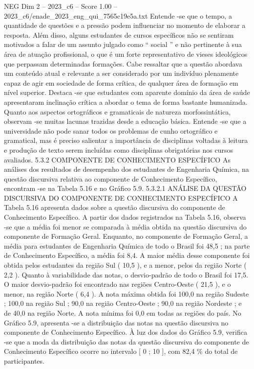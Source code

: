 \begin{textsample}{NEG Dim 2 – 2023\_c6 – Score 1.00 – 2023\_c6/enade\_2023\_eng\_qui\_7565c19e5a.txt}
Entende -se que o tempo, a quantidade de questões e a pressão podem influenciar no momento de elaborar a resposta.
Além disso, alguns estudantes de cursos específicos não se sentiram motivados a falar de um assunto julgado como “ social ” e não pertinente à sua área de atuação profissional, o que é um forte representativo de vieses ideológicos que perpassam determinadas formações.
Cabe ressaltar que a questão abordava um conteúdo atual e relevante a ser considerado por um indivíduo plenamente capaz de agir em sociedade de forma crítica, de qualquer área de formação em nível superior.
Destaca -se que estudantes com aparente domínio da área de saúde apresentaram inclinação crítica a abordar o tema de forma bastante humanizada.
Quanto aos aspectos ortográficos e gramaticais de natureza morfossintática, observam -se muitas lacunas trazidas desde a educação básica.
Entende -se que a universidade não pode sanar todos os problemas de cunho ortográfico e gramatical, mas é preciso salientar a importância de disciplinas voltadas à leitura e produção de texto serem incluídas como disciplinas obrigatórias nos cursos avaliados. 5.3.2 COMPONENTE DE CONHECIMENTO ESPECÍFICO As análises dos resultados de desempenho dos estudantes de Engenharia Química, na questão discursiva relativa ao componente de Conhecimento Específico, encontram -se na Tabela 5.16 e no Gráfico 5.9. 5.3.2.1 ANÁLISE DA QUESTÃO DISCURSIVA DO COMPONENTE DE CONHECIMENTO ESPECÍFICO A Tabela 5.16 apresenta dados sobre a questão discursiva do componente de Conhecimento Específico.
A partir dos dados registrados na Tabela 5.16, observa -se que a média foi menor se comparada à média obtida na questão discursiva do componente de Formação Geral.
Enquanto, no componente de Formação Geral, a média para estudantes de Engenharia Química de todo o Brasil foi 48,5 ; na parte de Conhecimento Específico, a média foi 8,4.
A maior média desse componente foi obtida pelos estudantes da região Sul ( 10,5 ), e a menor, pelos da região Norte ( 2,2 ).
Quanto à variabilidade das notas, o desvio-padrão de todo o Brasil foi 17,5.
O maior desvio-padrão foi encontrado nas regiões Centro-Oeste ( 21,5 ), e o menor, na região Norte ( 6,4 ).
A nota máxima obtida foi 100,0 na região Sudeste ; 100,0 na região Sul ; 90,0 na região Centro-Oeste ; 90,0 na região Nordeste ; e de 40,0 na região Norte.
A nota mínima foi 0,0 em todas as regiões do país.
No Gráfico 5.9, apresenta -se a distribuição das notas na questão discursiva no componente de Conhecimento Específico.
À luz dos dados do Gráfico 5.9, verifica -se que a moda da distribuição das notas da questão discursiva do componente de Conhecimento Específico ocorre no intervalo [ 0 ; 10 ], com 82,4 \% do total de participantes.

\end{textsample}
